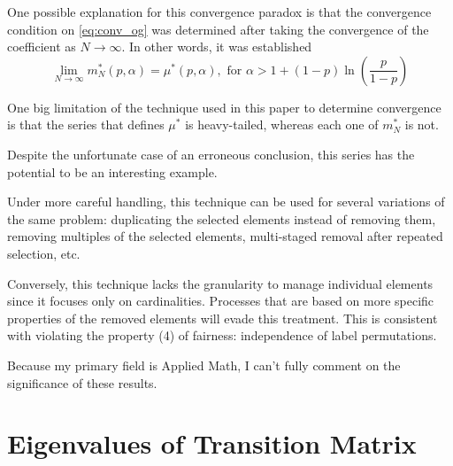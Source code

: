\documentclass{article}
\newcommand{\ppar}[1]{\left( #1 \right)}
\begin{document}
One possible explanation for this convergence paradox is that the convergence condition on \eqref{eq:conv_og} was determined after taking the convergence of the coefficient as $N\rightarrow \infty$.
%
In other words, it was established
\begin{equation}
    \lim_{N \rightarrow \infty} m^*_N (p, \alpha) = \mu^*(p,\alpha), \text{ for }\alpha > 1 + \ppar{1-p} \ln{\ppar{\frac{p}{1-p}}} 
\end{equation}

One big limitation of the technique used in this paper to determine convergence is that the series that defines $\mu^*$ is heavy-tailed, whereas each one of $m^*_N$ is not.

Despite the unfortunate case of an erroneous conclusion, this series has the potential to be an interesting example.

Under more careful handling, this technique can be used for several variations of the same problem: duplicating the selected elements instead of removing them, removing multiples of the selected elements, multi-staged removal after repeated selection, etc.

Conversely, this technique lacks the granularity to manage individual elements since it focuses only on cardinalities. 
%
Processes that are based on more specific properties of the removed elements will evade this treatment.
%
This is consistent with violating the property (4) of fairness: independence of label permutations.


Because my primary field is Applied Math, I can't fully comment on the significance of these results. 




\newpage

\appendix 

\section{Eigenvalues of Transition Matrix}
\label{ap:eigenvalues}
\end{document}
